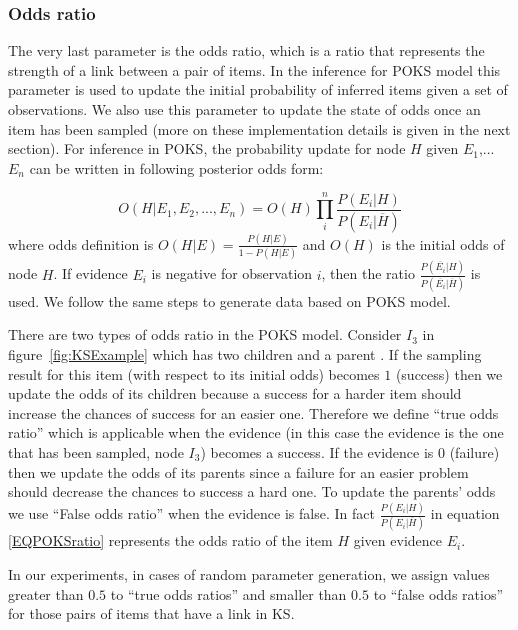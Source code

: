 \subsubsection{Odds ratio}

The very last parameter is the odds ratio, which is a ratio that represents the strength of a link between a pair of items. In the inference for POKS model this parameter is used to update the initial probability of inferred items given a set of observations. We also use this parameter to update the state of odds once an item has been sampled (more on these implementation details is given in the next section).
For inference in POKS, the probability update for node $H$ given $E_1$,... $E_n$ can be written in following posterior odds form:

\begin{equation}
O(H|E_1,E_2, ... , E_n) = O(H) \prod_{i}^{n} \frac{P(E_i|H)}{P(E_i | \overline{H})}
\label{EQPOKSratio}
\end{equation}
where odds definition is $O(H|E) = \frac{P(H|E)}{1-P(H|E)}$ and $O(H)$ is the initial odds of node $H$. If evidence $E_i$ is negative for observation $i$, then the ratio $\frac{P(\overline{E_i}|H)}{P(\overline{E_i}|\overline{H})}$ is used. We follow the same steps to generate data based on POKS model. 

There are two types of odds ratio in the POKS model. Consider $I_{3}$ in figure~\ref{fig:KSExample} which has two children and a parent . If the sampling result for this item (with respect to its initial odds) becomes $1$ (success) then we update the odds of its children because a success for a harder item should increase the chances of success for an easier one. Therefore we define ``true odds ratio'' which is applicable when the evidence (in this case the evidence is the one that has been sampled, node $I_{3}$) becomes a success. If the evidence is $0$ (failure) then we update the odds of its parents since a failure for an easier problem should decrease the chances to success a hard one. To update the parents' odds we use ``False odds ratio'' when the evidence is false. In fact $\frac{P(E_i|H)}{P(E_i | \overline{H})}$ in equation \ref{EQPOKSratio} represents the odds ratio of the item $H$ given evidence $E_i$. 

In our experiments, in cases of random parameter generation, we assign values greater than $0.5$ to ``true odds ratios'' and smaller than $0.5$ to ``false odds ratios'' for those pairs of items that have a link in KS. 

